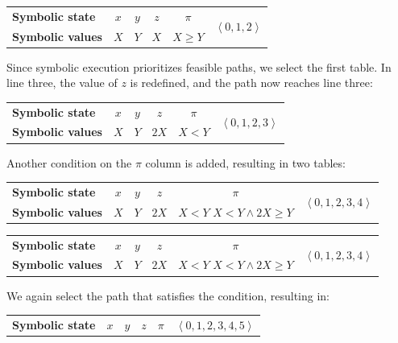 \begin{example}
\begin{table}[H]
\begin{tabular}{l|ccccc}
        \textbf{Symbolic state}  & $x$ & $y$ & $z$ & $\pi$ & \multirow{2}{*}{$\left\langle 0,1,2 \right\rangle $} \\ \cline{1-5}
        \textbf{Symbolic values} & $X$ & $Y$ & $X$ & $X\geq Y$ &                    
        \end{tabular}
    \end{table}
    Since symbolic execution prioritizes feasible paths, we select the first table. 
    In line three, the value of $z$ is redefined, and the path now reaches line three:
    \begin{table}[H]
        \centering
        \begin{tabular}{l|ccccc}
        \textbf{Symbolic state}  & $x$ & $y$ & $z$ & $\pi$ & \multirow{2}{*}{$\left\langle 0,1,2,3 \right\rangle $} \\ \cline{1-5}
        \textbf{Symbolic values} & $X$ & $Y$ & $2X$ & $X<Y$ &                    
        \end{tabular}
    \end{table}
    Another condition on the $\pi$ column is added, resulting in two tables:
    \begin{table}[H]
        \centering
        \begin{tabular}{l|ccccc}
        \textbf{Symbolic state}  & $x$ & $y$ & $z$ & $\pi$ & \multirow{2}{*}{$\left\langle 0,1,2,3,4 \right\rangle $} \\ \cline{1-5}
        \textbf{Symbolic values} & $X$ & $Y$ & $2X$ & \makecell{$X<Y$ \\ $X < Y \land 2X \geq Y$} &                    
        \end{tabular}
    \end{table}
    \begin{table}[H]
        \centering
        \begin{tabular}{l|ccccc}
        \textbf{Symbolic state}  & $x$ & $y$ & $z$ & $\pi$ & \multirow{2}{*}{$\left\langle 0,1,2,3,4 \right\rangle $} \\ \cline{1-5}
        \textbf{Symbolic values} & $X$ & $Y$ & $2X$ & \makecell{$X<Y$ \\ $X < Y \land 2X \geq Y$} &                    
        \end{tabular}
    \end{table}
    We again select the path that satisfies the condition, resulting in:
    \begin{table}[H]
        \centering
        \begin{tabular}{l|ccccc}
        \textbf{Symbolic state}  & $x$ & $y$ & $z$  & $\pi$                                         & \multirow{2}{*}{$\left\langle 0,1,2,3,4,5 \right\rangle $} \\ \cline{1-5}

\end{tabular}
\end{table}
\end{example}
